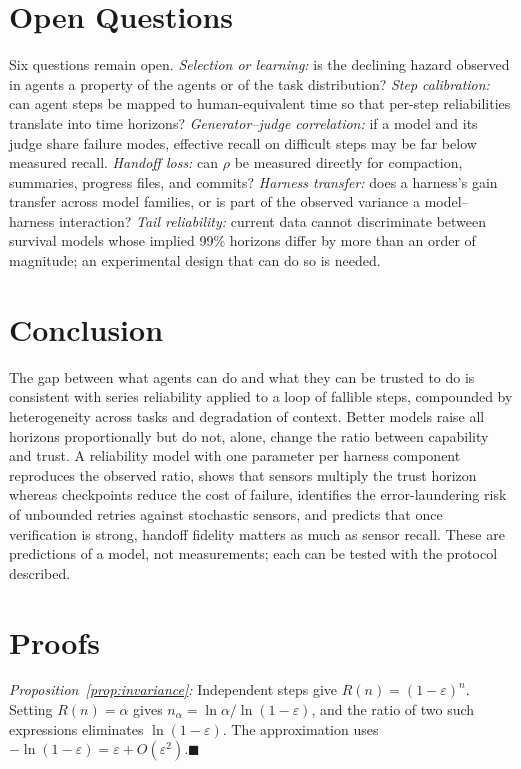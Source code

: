 \documentclass[journal]{IEEEtran}
\begin{document}
\section{Open Questions}\label{sec:open}
Six questions remain open. \emph{Selection or learning:} is the declining hazard observed in agents a property of the agents or of the task distribution? \emph{Step calibration:} can agent steps be mapped to human-equivalent time so that per-step reliabilities translate into time horizons? \emph{Generator--judge correlation:} if a model and its judge share failure modes, effective recall on difficult steps may be far below measured recall. \emph{Handoff loss:} can $\rho$ be measured directly for compaction, summaries, progress files, and commits? \emph{Harness transfer:} does a harness's gain transfer across model families, or is part of the observed variance a model--harness interaction? \emph{Tail reliability:} current data cannot discriminate between survival models whose implied 99\% horizons differ by more than an order of magnitude; an experimental design that can do so is needed.

\section{Conclusion}\label{sec:conclusion}
The gap between what agents can do and what they can be trusted to do is consistent with series reliability applied to a loop of fallible steps, compounded by heterogeneity across tasks and degradation of context. Better models raise all horizons proportionally but do not, alone, change the ratio between capability and trust. A reliability model with one parameter per harness component reproduces the observed ratio, shows that sensors multiply the trust horizon whereas checkpoints reduce the cost of failure, identifies the error-laundering risk of unbounded retries against stochastic sensors, and predicts that once verification is strong, handoff fidelity matters as much as sensor recall. These are predictions of a model, not measurements; each can be tested with the protocol described.

\appendices
\section{Proofs}\label{app:proofs}
\emph{Proposition~\ref{prop:invariance}:} Independent steps give $R(n)=(1-\varepsilon)^n$. Setting $R(n)=\alpha$ gives $n_\alpha=\ln\alpha/\ln(1-\varepsilon)$, and the ratio of two such expressions eliminates $\ln(1-\varepsilon)$. The approximation uses $-\ln(1-\varepsilon)=\varepsilon+O(\varepsilon^2)$.\hfill$\blacksquare$
\end{document}
